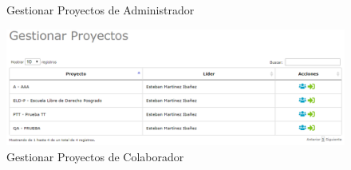 \begin{enumerate}
\begin{figure}[htbp!]
\begin{center}
						\caption{Gestionar Proyectos de Administrador}
						\label{fig:GPAD}
					\end{center}
				\end{figure}
			
			\begin{figure}[htbp!]
				\begin{center}
					\includegraphics[scale=0.5]{images/inicioSesion/IU5gestionarproyectosColaborador}
					\caption{Gestionar Proyectos de Colaborador}
					\label{fig:GPCOL}
				\end{center}
			\end{figure}

		\end{enumerate}
		
		
	
		

